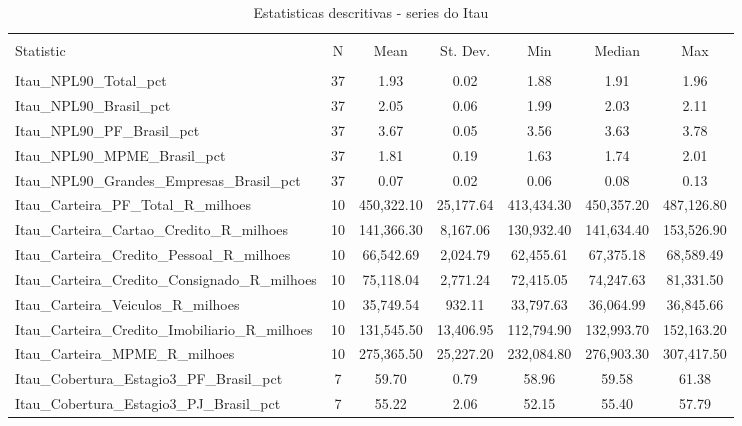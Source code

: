 
\begin{table}[!htbp] \centering 
  \caption{Estatisticas descritivas - series do Itau} 
  \label{tab:estatisticas_itau} 
\begin{tabular}{@{\extracolsep{5pt}}lcccccc} 
\\[-1.8ex]\hline 
\hline \\[-1.8ex] 
Statistic & \multicolumn{1}{c}{N} & \multicolumn{1}{c}{Mean} & \multicolumn{1}{c}{St. Dev.} & \multicolumn{1}{c}{Min} & \multicolumn{1}{c}{Median} & \multicolumn{1}{c}{Max} \\ 
\hline \\[-1.8ex] 
Itau\_NPL90\_Total\_pct & 37 & 1.93 & 0.02 & 1.88 & 1.91 & 1.96 \\ 
Itau\_NPL90\_Brasil\_pct & 37 & 2.05 & 0.06 & 1.99 & 2.03 & 2.11 \\ 
Itau\_NPL90\_PF\_Brasil\_pct & 37 & 3.67 & 0.05 & 3.56 & 3.63 & 3.78 \\ 
Itau\_NPL90\_MPME\_Brasil\_pct & 37 & 1.81 & 0.19 & 1.63 & 1.74 & 2.01 \\ 
Itau\_NPL90\_Grandes\_Empresas\_Brasil\_pct & 37 & 0.07 & 0.02 & 0.06 & 0.08 & 0.13 \\ 
Itau\_Carteira\_PF\_Total\_R\_milhoes & 10 & 450,322.10 & 25,177.64 & 413,434.30 & 450,357.20 & 487,126.80 \\ 
Itau\_Carteira\_Cartao\_Credito\_R\_milhoes & 10 & 141,366.30 & 8,167.06 & 130,932.40 & 141,634.40 & 153,526.90 \\ 
Itau\_Carteira\_Credito\_Pessoal\_R\_milhoes & 10 & 66,542.69 & 2,024.79 & 62,455.61 & 67,375.18 & 68,589.49 \\ 
Itau\_Carteira\_Credito\_Consignado\_R\_milhoes & 10 & 75,118.04 & 2,771.24 & 72,415.05 & 74,247.63 & 81,331.50 \\ 
Itau\_Carteira\_Veiculos\_R\_milhoes & 10 & 35,749.54 & 932.11 & 33,797.63 & 36,064.99 & 36,845.66 \\ 
Itau\_Carteira\_Credito\_Imobiliario\_R\_milhoes & 10 & 131,545.50 & 13,406.95 & 112,794.90 & 132,993.70 & 152,163.20 \\ 
Itau\_Carteira\_MPME\_R\_milhoes & 10 & 275,365.50 & 25,227.20 & 232,084.80 & 276,903.30 & 307,417.50 \\ 
Itau\_Cobertura\_Estagio3\_PF\_Brasil\_pct & 7 & 59.70 & 0.79 & 58.96 & 59.58 & 61.38 \\ 
Itau\_Cobertura\_Estagio3\_PJ\_Brasil\_pct & 7 & 55.22 & 2.06 & 52.15 & 55.40 & 57.79 \\ 

\end{tabular}
\end{table}
